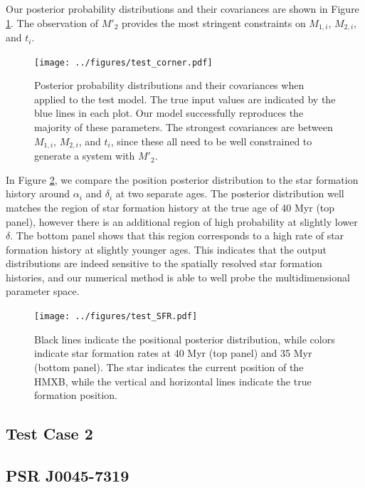 \documentclass[12pt, preprint]{aastex}
\begin{document}
Our posterior probability distributions and their covariances are shown in Figure \ref{fig:test_corner}. The observation of $M'_2$ provides the most stringent constraints on $M_{1,i}$, $M_{2,i}$, and $t_i$.

\begin{figure}[h!]
\begin{center}
\texttt{[image: ../figures/test\_corner.pdf]}
\caption{Posterior probability distributions and their covariances when applied to the test model. The true input values are indicated by the blue lines in each plot. Our model successfully reproduces the majority of these parameters. The strongest covariances are between $M_{1,i}$, $M_{2,i}$, and $t_i$, since these all need to be well constrained to generate a system with $M'_2$. }
\label{fig:test_corner}
\end{center}
\end{figure}


In Figure \ref{fig:test_SFR}, we compare the position posterior distribution to the star formation history around $\alpha_i$ and $\delta_i$ at two separate ages. The posterior distribution well matches the region of star formation history at the true age of 40 Myr (top panel), however there is an additional region of high probability at slightly lower $\delta$. The bottom panel shows that this region corresponds to a high rate of star formation history at slightly younger ages. This indicates that the output distributions are indeed sensitive to the spatially resolved star formation histories, and our numerical method is able to well probe the multidimensional parameter space.


\begin{figure}[h!]
\begin{center}
\texttt{[image: ../figures/test\_SFR.pdf]}
\caption{Black lines indicate the positional posterior distribution, while colors indicate star formation rates at 40 Myr (top panel) and 35 Myr (bottom panel). The star indicates the current position of the HMXB, while the vertical and horizontal lines indicate the true formation position.}
\label{fig:test_SFR}
\end{center}
\end{figure}


\subsection{Test Case 2}



\subsection{PSR J0045-7319}
\end{document}
